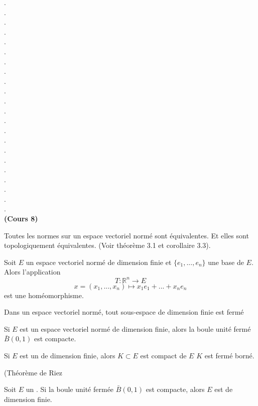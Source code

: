 \documentclass[12pt,a4paper]{article}
\begin{document}
\begin{flushleft}
.\\
.\\
.\\
.\\
.\\
.\\
.\\
.\\
.\\
.\\
.\\
.\\
.\\
.\\
.\\
.\\
.\\
.\\
.\\
.\\
.\\
.\\


\textbf{(Cours 8)}
\begin{cor} Toutes les normes sur un espace vectoriel normé sont équivalentes. Et elles sont topologiquement équivalentes. (Voir théorème 3.1 et corollaire 3.3).
\end{cor}

\begin{thm}
Soit $E$ un espace vectoriel normé de dimension finie et $ \{e_1, ..., e_n \}$ une base de $E$. Alors l'application $$T: \mathbb{R}^n \longrightarrow E$$ $$x = (x_1, ..., x_n) \mapsto x_1 e_1 + ... + x_n e_n$$ est une homéomorphisme.
\end{thm}

\begin{cor} 
Dans un espace vectoriel normé, tout sous-espace de dimension finie est fermé
\end{cor}

\begin{thm}
Si $E$ est un espace vectoriel normé de dimension finie, alors la boule unité fermé $\bar{B} (0,1)$ est compacte.
\end{thm}

\begin{thm}
Si $E$ est un \evn de dimension finie, alors $K \subset E$ est compact de $E$ \ssi $K$ est fermé borné.
\end{thm}

(Théorème de Riez
\begin{thm}
Soit $E$ un \evn . Si la boule unité fermée $\bar{B}(0,1)$ est compacte, alors $E$ est de dimension finie.
\end{thm}


\end{flushleft}
\end{document}

